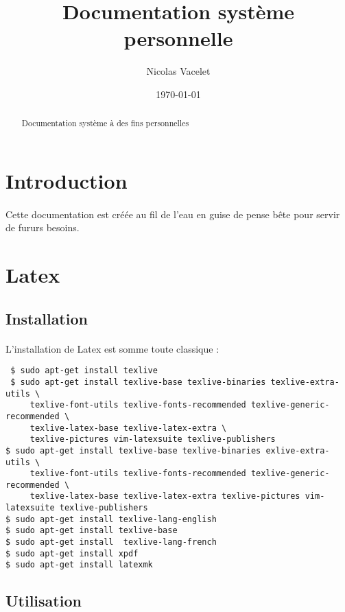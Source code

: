 \documentclass{article}
\title{Documentation système personnelle}
\author{Nicolas Vacelet}
\date{\today}
\begin{document}
\maketitle

\begin{abstract}
    \centering Documentation système à des fins personnelles
\end{abstract}

\tableofcontents
\newpage

\section{Introduction}
\paragraph{}
Cette documentation est créée au fil de l'eau en guise de pense bête pour servir de fururs besoins.

\section{Latex}\label{latex}

\subsection{Installation}
\paragraph{}
L'installation de Latex est somme toute classique :
\begin{verbatim}
 $ sudo apt-get install texlive
 $ sudo apt-get install texlive-base texlive-binaries texlive-extra-utils \
	 texlive-font-utils texlive-fonts-recommended texlive-generic-recommended \
	 texlive-latex-base texlive-latex-extra \
	 texlive-pictures vim-latexsuite texlive-publishers
$ sudo apt-get install texlive-base texlive-binaries exlive-extra-utils \
	 texlive-font-utils texlive-fonts-recommended texlive-generic-recommended \
	 texlive-latex-base texlive-latex-extra texlive-pictures vim-latexsuite texlive-publishers
$ sudo apt-get install texlive-lang-english
$ sudo apt-get install texlive-base
$ sudo apt-get install  texlive-lang-french
$ sudo apt-get install xpdf
$ sudo apt-get install latexmk
\end{verbatim}

\subsection{Utilisation}
\end{document}
